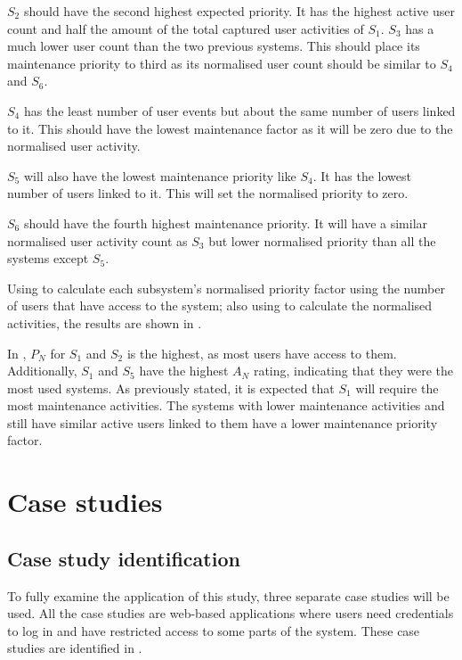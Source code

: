 $S_2$ should have the second highest expected priority. It has the highest active user count and half the amount of the total captured user activities of $S_1$. $S_3$ has a much lower user count than the two previous systems. This should place its maintenance priority to third as its normalised user count should be similar to $S_4$ and $S_6$.\par $S_4$ has the least number of user events but about the same number of users linked to it. This should have the lowest maintenance factor as it will be zero due to the normalised user activity. \par $S_5$ will also have the lowest maintenance priority like $S_4$. It has the lowest number of users linked to it. This will set the normalised priority to zero. \par $S_6$ should have the fourth highest maintenance priority. It will have a similar normalised user activity count as $S_3$ but lower normalised priority than all the systems except $S_5$. \par Using  to calculate each subsystem's normalised priority factor using the number of users that have access to the system; also using  to calculate the normalised activities, the results are shown in .



In , $P_N$ for $S_1$ and $S_2$ is the highest, as most users have access to them. Additionally, $S_1$ and $S_5$ have the highest $A_N$ rating, indicating that they were the most used systems. As previously stated, it is expected that $S_1$ will require the most maintenance activities. The systems with lower maintenance activities and still have similar active users linked to them have a lower maintenance priority factor.

\clearpage

\section{Case studies}\label{sec:ch3_caseStudies}

\subsection{Case study identification}
To fully examine the application of this study, three separate case studies will be used. All the case studies are web-based applications where users need credentials to log in and have restricted access to some parts of the system. These case studies are identified in .

